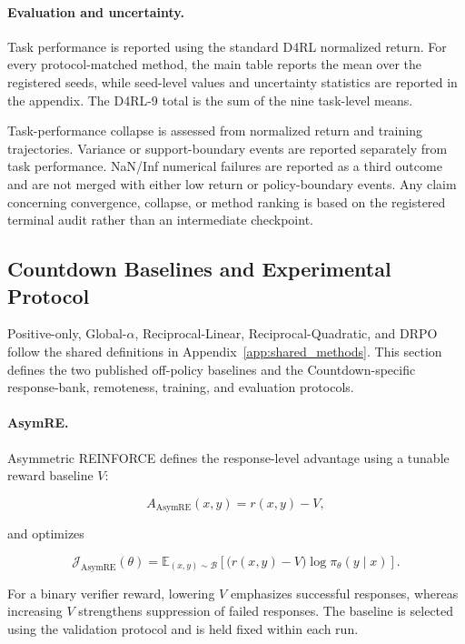 \documentclass[sigconf,anonymous,review]{acmart}
\theoremstyle{acmdefinition}
\begin{document}
\paragraph{Evaluation and uncertainty.}

Task performance is reported using the standard D4RL normalized return.
For every protocol-matched method, the main table reports the mean over
the registered seeds, while seed-level values and uncertainty
statistics are reported in the appendix. The D4RL-9 total is the sum of
the nine task-level means.

Task-performance collapse is assessed from normalized return and
training trajectories. Variance or support-boundary events are reported
separately from task performance. NaN/Inf numerical failures are
reported as a third outcome and are not merged with either low return or
policy-boundary events. Any claim concerning convergence, collapse, or
method ranking is based on the registered terminal audit rather than an
intermediate checkpoint.


\subsection{Countdown Baselines and Experimental Protocol}
\label{app:countdown_methods}

Positive-only, Global-\(\alpha\), Reciprocal-Linear,
Reciprocal-Quadratic, and DRPO follow the shared definitions in
Appendix~\ref{app:shared_methods}. This section defines the two
published off-policy baselines and the Countdown-specific response-bank,
remoteness, training, and evaluation protocols.

\paragraph{AsymRE.}

Asymmetric REINFORCE defines the response-level advantage using a
tunable reward baseline \(V\):

\[
A_{\mathrm{AsymRE}}(x,y)
=
r(x,y)-V,
\]

and optimizes

\[
\mathcal{J}_{\mathrm{AsymRE}}(\theta)
=
\mathbb{E}_{(x,y)\sim\mathcal{B}}
\left[
\bigl(r(x,y)-V\bigr)
\log\pi_\theta(y\mid x)
\right].
\]

For a binary verifier reward, lowering \(V\) emphasizes successful
responses, whereas increasing \(V\) strengthens suppression of failed
responses. The baseline is selected using the validation protocol and
is held fixed within each run.
\end{document}
